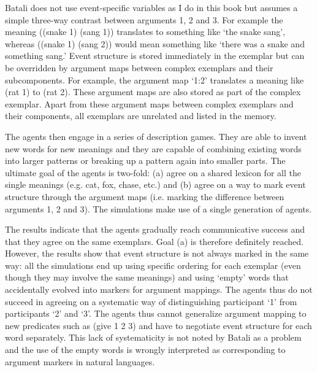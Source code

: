 Batali does not use event-specific variables as I do in this book but assumes a simple three-way contrast between arguments 1, 2 and 3. For example the meaning ((snake 1) (sang 1)) translates to something like `the snake sang', whereas ((snake 1) (sang 2)) would mean something like `there was a snake and something sang.' Event structure is stored immediately in the exemplar but can be overridden by argument maps between complex exemplars and their subcomponents. For example, the argument map `1:2' translates a meaning like (rat 1) to (rat 2). These argument maps are also stored as part of the complex exemplar. Apart from these argument maps between complex exemplars and their components, all exemplars are unrelated and listed in the memory.

The agents then engage in a series of description games. They are able to invent new words for new meanings and they are capable of combining existing words into larger patterns or breaking up a pattern again into smaller parts. The ultimate goal of the agents is two-fold: (a) agree on a shared lexicon for all the single meanings (e.g. cat, fox, chase, etc.) and (b) agree on a way to mark event structure through the argument maps (i.e. marking the difference between arguments 1, 2 and 3). The simulations make use of a single generation of agents.

The results indicate that the agents gradually reach communicative success and that they agree on the same exemplars. Goal (a) is therefore definitely reached. However, the results show that event structure is not always marked in the same way: all the simulations end up using specific ordering for each exemplar (even though they may involve the same meanings) and using `empty' words that accidentally evolved into markers for argument mappings. The agents thus do not succeed in agreeing on a systematic way of distinguishing participant `1' from participants `2' and `3'. The agents thus cannot generalize argument mapping to new predicates such as (give 1 2 3) and have to negotiate event structure for each word separately. This lack of systematicity is not noted by Batali as a problem and the use of the empty words is wrongly interpreted as corresponding to argument markers in natural languages.


